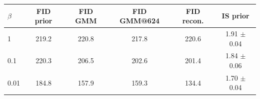 \begin{tabular}{lccccc}
\toprule
$\beta$ & FID prior & FID GMM & FID GMM@624 & FID recon. & IS prior \\
\midrule
1 & 219.2 & 220.8 & 217.8 & 220.6 & 1.91 $\pm$ 0.04 \\
0.1 & 220.3 & 206.5 & 202.6 & 201.4 & 1.84 $\pm$ 0.06 \\
0.01 & 184.8 & 157.9 & 159.3 & 134.4 & 1.70 $\pm$ 0.04 \\
\bottomrule
\end{tabular}
